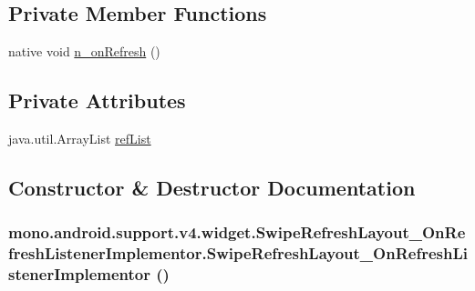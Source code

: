 \subsection*{Private Member Functions}
\begin{CompactItemize}
\item 
native void \hyperlink{classmono_1_1android_1_1support_1_1v4_1_1widget_1_1_swipe_refresh_layout___on_refresh_listener_implementor_ec13374be4e6082963add41367600292}{n\_\-onRefresh} ()
\end{CompactItemize}
\subsection*{Private Attributes}
\begin{CompactItemize}
\item 
java.util.ArrayList \hyperlink{classmono_1_1android_1_1support_1_1v4_1_1widget_1_1_swipe_refresh_layout___on_refresh_listener_implementor_0c98e283833d140bd38ebdffa66c695b}{refList}
\end{CompactItemize}


\subsection{Constructor \& Destructor Documentation}
\hypertarget{classmono_1_1android_1_1support_1_1v4_1_1widget_1_1_swipe_refresh_layout___on_refresh_listener_implementor_e5ee8d7d91388b8ea9bccbfba5f74438}{
\subsubsection[{SwipeRefreshLayout\_\-OnRefreshListenerImplementor}]{\setlength{\rightskip}{0pt plus 5cm}mono.android.support.v4.widget.SwipeRefreshLayout\_\-OnRefreshListenerImplementor.SwipeRefreshLayout\_\-OnRefreshListenerImplementor ()}}
\label{classmono_1_1android_1_1support_1_1v4_1_1widget_1_1_swipe_refresh_layout___on_refresh_listener_implementor_e5ee8d7d91388b8ea9bccbfba5f74438}




